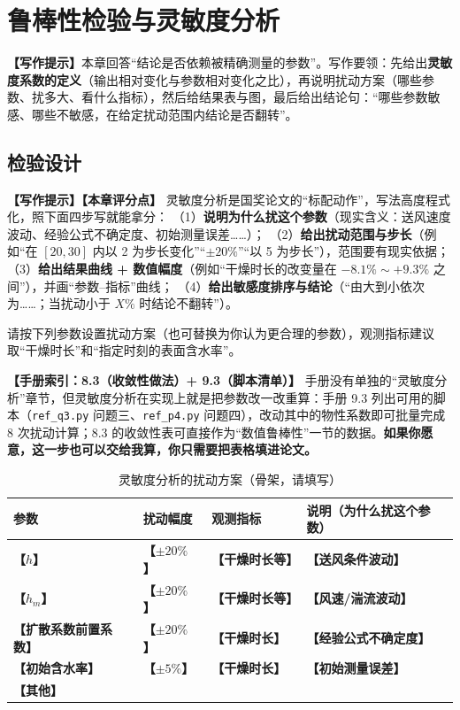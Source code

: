 \documentclass[12pt,a4paper]{article}
\newcommand{\prompt}[1]{\par\noindent\textbf{【写作提示】}#1\par}      %
\newcommand{\ph}[1]{\textbf{【#1】}}                                   %
\newcommand{\handbook}[2]{\par\noindent\textbf{【手册索引：#1】} #2\par}
\begin{document}
\section{鲁棒性检验与灵敏度分析}

\prompt{本章回答“结论是否依赖被精确测量的参数”。写作要领：先给出\textbf{灵敏度系数的定义}（输出相对变化与参数相对变化之比），再说明扰动方案（哪些参数、扰多大、看什么指标），然后给结果表与图，最后给出结论句：“哪些参数敏感、哪些不敏感，在给定扰动范围内结论是否翻转”。}

\subsection{检验设计}

\prompt{\textbf{【本章评分点】} 灵敏度分析是国奖论文的“标配动作”，写法高度程式化，照下面四步写就能拿分：
（1）\textbf{说明为什么扰这个参数}（现实含义：送风速度波动、经验公式不确定度、初始测量误差……）；
（2）\textbf{给出扰动范围与步长}（例如“在 $[20,30]$ 内以 2 为步长变化”“$\pm20\%$”“以 5 为步长”），范围要有现实依据；
（3）\textbf{给出结果曲线 + 数值幅度}（例如“干燥时长的改变量在 $-8.1\%\sim+9.3\%$ 之间”），并画“参数–指标”曲线；
（4）\textbf{给出敏感度排序与结论}（“由大到小依次为……；当扰动小于 $X\%$ 时结论不翻转”）。

请按下列参数设置扰动方案（也可替换为你认为更合理的参数），观测指标建议取“干燥时长”和“指定时刻的表面含水率”。}

\handbook{8.3（收敛性做法）+ 9.3（脚本清单）}{手册没有单独的“灵敏度分析”章节，但灵敏度分析在实现上就是把参数改一改重算：手册 9.3 列出可用的脚本（\texttt{ref\_q3.py} 问题三、\texttt{ref\_p4.py} 问题四），改动其中的物性系数即可批量完成 8 次扰动计算；8.3 的收敛性表可直接作为“数值鲁棒性”一节的数据。\textbf{如果你愿意，这一步也可以交给我算，你只需要把表格填进论文。}}

\begin{table}[H]
\centering
\caption{灵敏度分析的扰动方案（骨架，请填写）}
\label{tab:sensitivity-plan}
\begin{tabular}{p{3.4cm}p{3.0cm}p{3.4cm}p{4.4cm}}
\toprule
参数 & 扰动幅度 & 观测指标 & 说明（为什么扰这个参数）\\
\midrule
\ph{$h$} & \ph{$\pm20\%$} & \ph{干燥时长等} & \ph{送风条件波动}\\
\ph{$h_m$} & \ph{$\pm20\%$} & \ph{干燥时长等} & \ph{风速/湍流波动}\\
\ph{扩散系数前置系数} & \ph{$\pm20\%$} & \ph{干燥时长} & \ph{经验公式不确定度}\\
\ph{初始含水率} & \ph{$\pm5\%$} & \ph{干燥时长} & \ph{初始测量误差}\\
\ph{其他} & & & \\
\bottomrule
\end{tabular}
\end{table}
\end{document}
